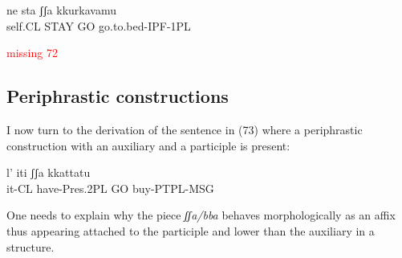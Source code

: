 \documentclass[output=paper,colorlinks,citecolor=brown,
]{langscibook}
\begin{document}
\ea
    \gll ne     sta    ʃʃa  kkurkavamu\\
   self.CL STAY GO  go.to.bed-IPF-1PL\\
\z

\ea
\textcolor{red}{missing 72}
\z

\subsection{Periphrastic constructions}

I now turn to the derivation of the sentence in (73) where a periphrastic construction with an auxiliary and a participle is present:

\ea
\gll l’    iti         ʃʃa   kkattatu\\
   it-CL  have-Pres.2PL    GO  buy-PTPL-MSG\\
\z

One needs to explain why the piece \textit{ʃʃa/bba} behaves morphologically as an affix thus appearing attached  to the participle and lower than the auxiliary in a structure.
\end{document}

